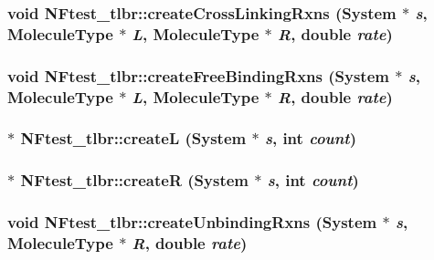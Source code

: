 \subsubsection{\setlength{\rightskip}{0pt plus 5cm}void NFtest\_\-tlbr::createCrossLinkingRxns ({\bf System} $\ast$ {\em s}, {\bf MoleculeType} $\ast$ {\em L}, {\bf MoleculeType} $\ast$ {\em R}, double {\em rate})}\label{namespaceNFtest__tlbr_e44e76d8752423f5408cc757df3a916c}


\subsubsection{\setlength{\rightskip}{0pt plus 5cm}void NFtest\_\-tlbr::createFreeBindingRxns ({\bf System} $\ast$ {\em s}, {\bf MoleculeType} $\ast$ {\em L}, {\bf MoleculeType} $\ast$ {\em R}, double {\em rate})}\label{namespaceNFtest__tlbr_59f11b34acb45bf5e498c5072a39b3c2}


\subsubsection{ $\ast$ NFtest\_\-tlbr::createL ({\bf System} $\ast$ {\em s}, int {\em count})}\label{namespaceNFtest__tlbr_add22a89849f4de69e5d1ea7dab83815}


\subsubsection{ $\ast$ NFtest\_\-tlbr::createR ({\bf System} $\ast$ {\em s}, int {\em count})}\label{namespaceNFtest__tlbr_eacb973707025050daf6e34d522f443d}


\subsubsection{\setlength{\rightskip}{0pt plus 5cm}void NFtest\_\-tlbr::createUnbindingRxns ({\bf System} $\ast$ {\em s}, {\bf MoleculeType} $\ast$ {\em R}, double {\em rate})}\label{namespaceNFtest__tlbr_c0ce00086175e31ba2e50007ff4d3549}


